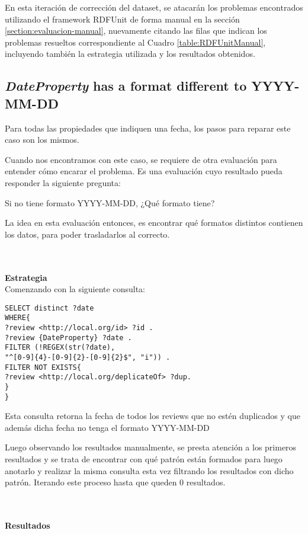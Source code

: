 \noindent En esta iteración de corrección del dataset, se atacarán los problemas encontrados utilizando el framework RDFUnit de forma manual 
en la sección \ref{section:evaluacion-manual}, nuevamente citando las filas que indican los problemas resueltos correspondiente al
Cuadro \ref{table:RDFUnitManual}, incluyendo también la estrategia utilizada y los resultados obtenidos.

\subsection*{\textit{DateProperty} has a format different to YYYY-MM-DD}
Para todas las propiedades que indiquen una fecha, los pasos para reparar este caso son los mismos.

Cuando nos encontramos con este caso, se requiere de otra evaluación para entender cómo encarar el problema. Es una evaluación cuyo resultado
pueda responder la siguiente pregunta:

Si no tiene formato YYYY-MM-DD, ¿Qué formato tiene?

La idea en esta evaluación entonces, es encontrar qué formatos distintos contienen los datos, para poder trasladarlos al correcto.

~\\\\ 
\textbf{Estrategia}\\
Comenzando con la siguiente consulta:

\newpage
\begin{lstlisting}[frame=single]  
SELECT distinct ?date 
WHERE{
?review <http://local.org/id> ?id .
?review {DateProperty} ?date .
FILTER (!REGEX(str(?date), 
"^[0-9]{4}-[0-9]{2}-[0-9]{2}$", "i")) .
FILTER NOT EXISTS{
?review <http://local.org/deplicateOf> ?dup.
}
}
\end{lstlisting}



Esta consulta retorna la fecha de todos los reviews que no estén duplicados y que además dicha fecha no tenga el formato YYYY-MM-DD

Luego observando los resultados manualmente, se presta atención a los primeros resultados y se trata de encontrar con qué patrón están formados 
para luego anotarlo y realizar la misma consulta esta vez filtrando los resultados con dicho patrón. Iterando este proceso hasta que 
queden 0 resultados.

~\\\\\textbf{Resultados}\\

